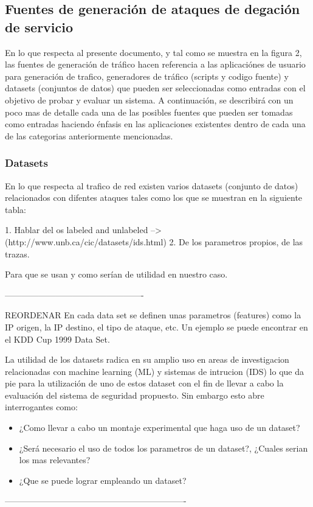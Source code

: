 \documentclass[12pt]{article}
\begin{document}
\subsection{Fuentes de generación de ataques de degación de servicio}

En lo que respecta al presente documento, y tal como se muestra en la figura 2, las fuentes de generación de tráfico hacen referencia a las aplicaciónes de usuario para generación de trafico, generadores de tráfico (scripts y codigo fuente) y datasets (conjuntos de datos) que pueden ser seleccionadas como entradas con el objetivo de probar y evaluar un sistema. A continuación, se describirá con un poco mas de detalle cada una de las posibles fuentes que pueden ser tomadas como entradas haciendo énfasis en las aplicaciones existentes dentro de cada una de las categorias anteriormente mencionadas.

\subsubsection{Datasets}

En lo que respecta al trafico de red existen varios datasets (conjunto de datos) relacionados con difentes ataques tales como los que se muestran en la siguiente tabla:


1. Hablar del os labeled and unlabeled --> (http://www.unb.ca/cic/datasets/ids.html)
2. De los parametros propios, de las trazas.

Para que se usan y como serían de utilidad en nuestro caso.



-------------------------------------------------

REORDENAR
En cada data set se definen unas parametros (features) como la IP origen, la IP destino, el tipo de ataque, etc. Un ejemplo se puede encontrar en el KDD Cup 1999 Data Set\citep{kdd_desc, CIDDS-001}.

La utilidad de los datasets radica en su amplio uso en areas de investigacion relacionadas con machine learning (ML) y sistemas de intrucion (IDS) \citep{using_kdd} lo que da pie para la utilización de uno de estos dataset con el fin de llevar a cabo la evaluación del sistema de seguridad propuesto. Sin embargo esto abre interrogantes como:
\begin{itemize}
\item ¿Como llevar a cabo un montaje experimental que haga uso de un dataset?
\item ¿Será necesario el uso de todos los parametros de un dataset?, ¿Cuales serian los mas relevantes? 
\item ¿Que se puede lograr empleando un dataset?
\end{itemize}
----------------------------------------------------------------
\end{document}

